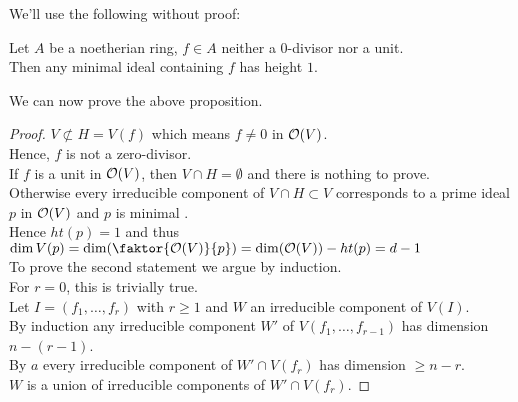 \documentclass[../main.tex]{subfiles}
\begin{document}
We'll use the following without proof:
\begin{thm}
Let $A$ be a noetherian ring, $f\in A$ neither a 0-divisor nor a unit.\\
Then any minimal ideal containing $f$ has height $1$.
\end{thm}
We can now prove the above proposition.
\begin{proof}
$V \not \subset H = V( f) $ which means $f\neq 0$ in $\mathcal{O}( V) $.\\
Hence, $f$ is not a zero-divisor.\\
If $f$ is a unit in $\mathcal{O}( V)$, then $V\cap H= \emptyset$ and there is nothing to prove.\\
Otherwise every irreducible component of $V\cap H \subset V$ corresponds to a prime ideal $p$ in $\mathcal{O}( V) $ and $p$ is minimal .\\
Hence $ht( p) =1$ and thus $\dim V( p) = \dim ( \faktor { \O( V) } { p} ) = \dim( \O( V) ) - ht( p) = d-1$ \\

To prove the second statement we argue by induction.\\
For $r=0$, this is trivially true.\\
Let $I= ( f_1,\ldots,f_r) $ with $r \geq 1$ and $W$ an irreducible component of $V( I) $.\\
By induction any irreducible component $W'$ of $V( f_1,\ldots,f_{r-1} ) $ has dimension $n- ( r-1) $.\\
By $a$ every irreducible component of $W' \cap V( f_r) $ has dimension $ \geq n-r$.\\
$W$ is a union of irreducible components of $W'\cap V( f_r) $.
\end{proof}
\end{document}
